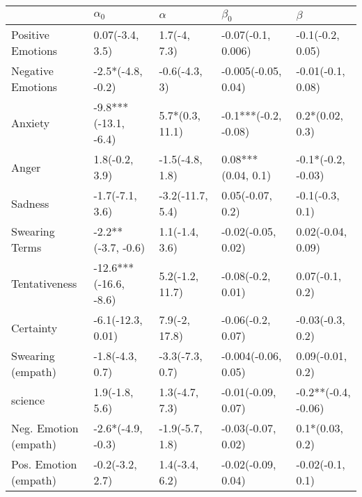 \begin{tabular}{lllll}
\toprule
{} &             $\alpha_0$ &          $\alpha$ &             $\beta_0$ &              $\beta$ \\
\midrule
Positive Emotions     &        0.07(-3.4, 3.5) &      1.7(-4, 7.3) &    -0.07(-0.1, 0.006) &     -0.1(-0.2, 0.05) \\
Negative Emotions     &      -2.5*(-4.8, -0.2) &     -0.6(-4.3, 3) &   -0.005(-0.05, 0.04) &    -0.01(-0.1, 0.08) \\
Anxiety               &   -9.8***(-13.1, -6.4) &   5.7*(0.3, 11.1) &  -0.1***(-0.2, -0.08) &      0.2*(0.02, 0.3) \\
Anger                 &         1.8(-0.2, 3.9) &   -1.5(-4.8, 1.8) &    0.08***(0.04, 0.1) &   -0.1*(-0.2, -0.03) \\
Sadness               &        -1.7(-7.1, 3.6) &  -3.2(-11.7, 5.4) &      0.05(-0.07, 0.2) &      -0.1(-0.3, 0.1) \\
Swearing Terms        &     -2.2**(-3.7, -0.6) &    1.1(-1.4, 3.6) &    -0.02(-0.05, 0.02) &    0.02(-0.04, 0.09) \\
Tentativeness         &  -12.6***(-16.6, -8.6) &   5.2(-1.2, 11.7) &     -0.08(-0.2, 0.01) &      0.07(-0.1, 0.2) \\
Certainty             &      -6.1(-12.3, 0.01) &     7.9(-2, 17.8) &     -0.06(-0.2, 0.07) &     -0.03(-0.3, 0.2) \\
Swearing (empath)     &        -1.8(-4.3, 0.7) &   -3.3(-7.3, 0.7) &   -0.004(-0.06, 0.05) &     0.09(-0.01, 0.2) \\
science               &         1.9(-1.8, 5.6) &    1.3(-4.7, 7.3) &    -0.01(-0.09, 0.07) &  -0.2**(-0.4, -0.06) \\
Neg. Emotion (empath) &      -2.6*(-4.9, -0.3) &   -1.9(-5.7, 1.8) &    -0.03(-0.07, 0.02) &      0.1*(0.03, 0.2) \\
Pos. Emotion (empath) &        -0.2(-3.2, 2.7) &    1.4(-3.4, 6.2) &    -0.02(-0.09, 0.04) &     -0.02(-0.1, 0.1) \\
\bottomrule
\end{tabular}
